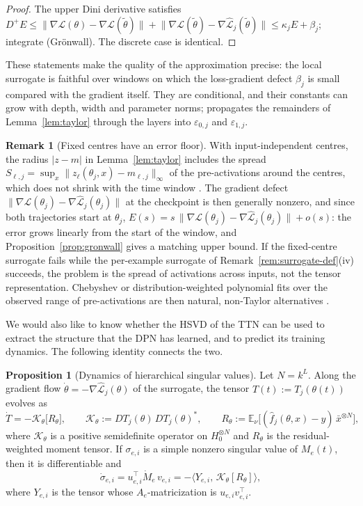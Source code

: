 \documentclass[11pt]{article}
\newcommand{\E}{\mathbb{E}}
\newcommand{\norm}[1]{\lVert #1\rVert}
\newcommand{\xb}{\bar{x}}
\newcommand{\Lhat}{\widehat{\mathcal L}}
\newcommand{\fhat}{\hat f}
\theoremstyle{definition}
\newtheorem{proposition}[theorem]{Proposition}
\newtheorem{remark}[theorem]{Remark}
\numberwithin{equation}{section}
\begin{document}
\begin{proof}
The upper Dini derivative satisfies $D^+E\le\norm{\nabla\mathcal L(\theta)-\nabla\mathcal L(\tilde\theta)}+\norm{\nabla\mathcal L(\tilde\theta)-\nabla\Lhat_j(\tilde\theta)}\le\kappa_jE+\beta_j$; integrate (Gr\"onwall). The discrete case is identical.
\end{proof}

These statements make the quality of the approximation precise: the local surrogate is faithful over windows on which the loss-gradient defect $\beta_j$ is small compared with the gradient itself. They are conditional, and their constants can grow with depth, width and parameter norms; \citet[Appendix~A]{hfl_local} propagates the remainders of Lemma~\ref{lem:taylor} through the layers into $\varepsilon_{0,j}$ and $\varepsilon_{1,j}$.

\begin{remark}[Fixed centres have an error floor]\label{rem:floor}
With input-independent centres, the radius $|z-m|$ in Lemma~\ref{lem:taylor} includes the spread $S_{\ell,j}=\sup_x\norm{z_\ell(\theta_j,x)-m_{\ell,j}}_\infty$ of the pre-activations around the centres, which does not shrink with the time window \citep[Section~6.3]{hfl_local}. The gradient defect $\norm{\nabla\mathcal L(\theta_j)-\nabla\Lhat_j(\theta_j)}$ at the checkpoint is then generally nonzero, and since both trajectories start at $\theta_j$, $E(s)=s\,\norm{\nabla\mathcal L(\theta_j)-\nabla\Lhat_j(\theta_j)}+o(s)$: the error grows linearly from the start of the window, and Proposition~\ref{prop:gronwall} gives a matching upper bound. If the fixed-centre surrogate fails while the per-example surrogate of Remark~\ref{rem:surrogate-def}(iv) succeeds, the problem is the spread of activations across inputs, not the tensor representation. Chebyshev or distribution-weighted polynomial fits over the observed range of pre-activations are then natural, non-Taylor alternatives \citep[Section~8.2]{hfl_surrogate}.
\end{remark}

We would also like to know whether the HSVD of the TTN can be used to extract the structure that the DPN has learned, and to predict its training dynamics. The following identity connects the two.

\begin{proposition}[Dynamics of hierarchical singular values]\label{prop:sv-dynamics}
Let $N=k^L$. Along the gradient flow $\dot\theta=-\nabla\Lhat_j(\theta)$ of the surrogate, the tensor $T(t):=T_j(\theta(t))$ evolves as
\[
\dot T=-\mathcal K_\theta\big[R_\theta\big],\qquad
\mathcal K_\theta:=DT_j(\theta)\,DT_j(\theta)^*,\qquad
R_\theta:=\E_\nu\big[(\fhat_j(\theta,x)-y)\,\xb^{\otimes N}\big],
\]
where $\mathcal K_\theta$ is a positive semidefinite operator on $H_0^{\otimes N}$ and $R_\theta$ is the residual-weighted moment tensor. If $\sigma_{e,i}$ is a simple nonzero singular value of $M_e(t)$, then it is differentiable and
\[
\dot\sigma_{e,i}=u_{e,i}^\top\dot M_e\,v_{e,i}=-\big\langle Y_{e,i},\,\mathcal K_\theta[R_\theta]\big\rangle,
\]
where $Y_{e,i}$ is the tensor whose $A_e$-matricization is $u_{e,i}v_{e,i}^\top$.
\end{proposition}
\end{document}
